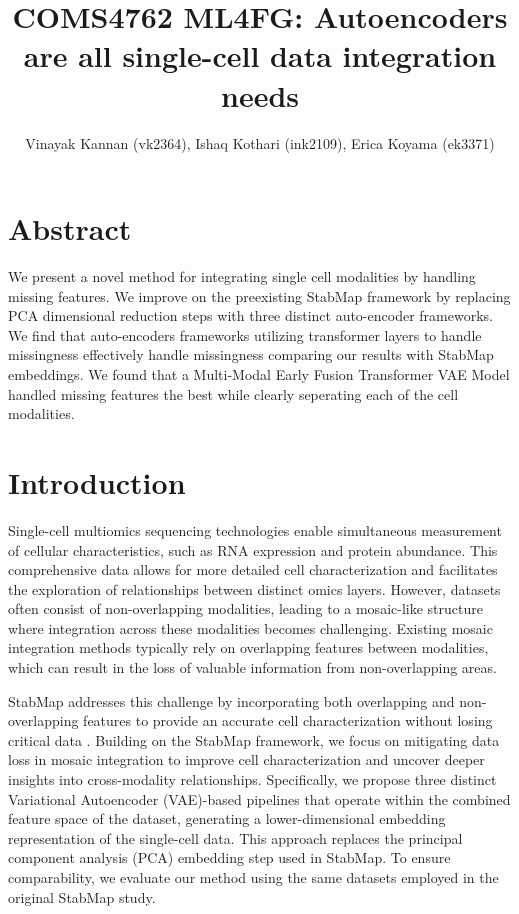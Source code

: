 \documentclass[11pt,a4paper]{article}
\begin{document}
\title{\vspace{-2.0cm}COMS4762 ML4FG: Autoencoders are all single-cell data integration  needs}
\author{Vinayak Kannan (vk2364), Ishaq Kothari (ink2109), Erica Koyama (ek3371)}
\date{}
\maketitle
\section*{Abstract}
We present a novel method for integrating single cell modalities by handling missing features. We improve on the preexisting StabMap framework by replacing PCA dimensional reduction steps with three distinct auto-encoder frameworks. We find that auto-encoders frameworks utilizing transformer layers to handle missingness effectively handle missingness comparing our results with StabMap embeddings. We found that a Multi-Modal Early Fusion Transformer VAE Model handled missing features the best while clearly seperating each of the cell modalities.
\section{Introduction}
Single-cell multiomics sequencing technologies enable simultaneous measurement of cellular characteristics, such as RNA expression and protein abundance. This comprehensive data allows for more detailed cell characterization and facilitates the exploration of relationships between distinct omics layers. However, datasets often consist of non-overlapping modalities, leading to a mosaic-like structure where integration across these modalities becomes challenging. Existing mosaic integration methods typically rely on overlapping features between modalities, which can result in the loss of valuable information from non-overlapping areas.

StabMap addresses this challenge by incorporating both overlapping and non-overlapping features to provide an accurate cell characterization without losing critical data \cite{stabmap}. Building on the StabMap framework, we focus on mitigating data loss in mosaic integration to improve cell characterization and uncover deeper insights into cross-modality relationships. Specifically, we propose three distinct Variational Autoencoder (VAE)-based pipelines that operate within the combined feature space of the dataset, generating a lower-dimensional embedding representation of the single-cell data. This approach replaces the principal component analysis (PCA) embedding step used in StabMap. To ensure comparability, we evaluate our method using the same datasets employed in the original StabMap study.
\end{document}
